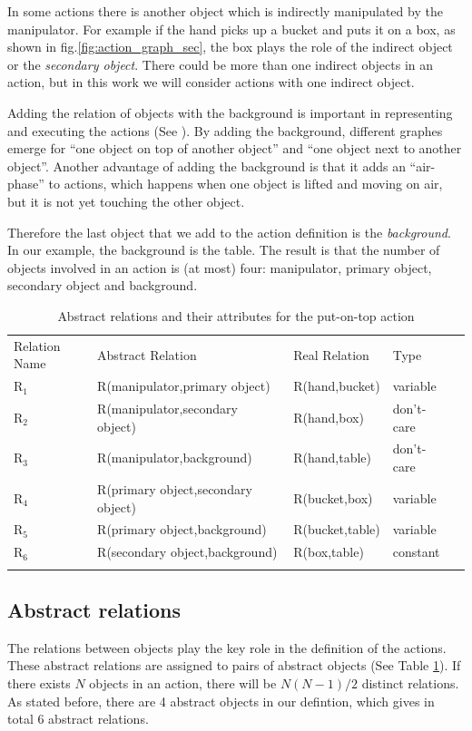 In some actions there is another object which is indirectly manipulated by the manipulator.
For example if the hand picks up a bucket and puts it on a box, as shown in fig.\ref{fig:action_graph_sec},
the box plays the role of the indirect object or the \textit{secondary object}.
There could be more than one indirect objects in an action, but in this work we will consider actions with one indirect object.

Adding the relation of objects with the background is important in representing and executing the actions (See \cite{TAMD13}).
By adding the background, different graphes emerge for ``one object on top of another object'' and ``one object next to another object''.
Another advantage of adding the background is that it adds an ``air-phase'' to actions,
which happens when one object is lifted and moving on air, but it is not yet touching the other object.

Therefore the last object that we add to the action definition is the \textit{background}.
In our example, the background is the table.
The result is that the number of objects involved in an action is (at most) four: manipulator, primary object, secondary object and background.

\begin{table}
\caption{Abstract relations and their attributes for the put-on-top action}
\begin{tabular}{ lllll }
\hline\noalign{\smallskip}
Relation Name & Abstract Relation & Real Relation & Type \\
\noalign{\smallskip}\hline\noalign{\smallskip}
$\text{R}_1$  & R(manipulator,primary object) & R(hand,bucket) & variable \\
$\text{R}_2$  & R(manipulator,secondary object)& R(hand,box) & don't-care \\
$\text{R}_3$  & R(manipulator,background) & R(hand,table) & don't-care \\
$\text{R}_4$  & R(primary object,secondary object) & R(bucket,box) & variable  \\
$\text{R}_5$  & R(primary object,background) & R(bucket,table) & variable \\
$\text{R}_6$  & R(secondary object,background)& R(box,table) & constant \\
\noalign{\smallskip}\hline
\end{tabular}
\label{tab:relations}
\end{table}

\subsection{Abstract relations}
The relations between objects play the key role in the definition of the actions.
These abstract relations are assigned to pairs of abstract objects (See Table \ref{tab:relations}).
If there exists $N$ objects in an action,
there will be $N(N-1)/2$ distinct relations.
As stated before, there are 4 abstract objects in our defintion, which gives in total 6 abstract relations.


